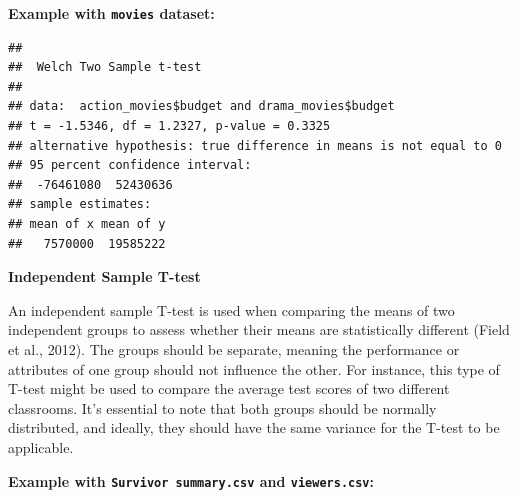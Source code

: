 \documentclass[
  b5paper]{book}
\newenvironment{Shaded}{\begin{snugshade}}{\end{snugshade}}
\newcommand{\CommentTok}[1]{\textcolor[rgb]{0.56,0.35,0.01}{\textit{#1}}}
\newcommand{\FunctionTok}[1]{\textcolor[rgb]{0.13,0.29,0.53}{\textbf{#1}}}
\newcommand{\NormalTok}[1]{#1}
\newcommand{\OtherTok}[1]{\textcolor[rgb]{0.56,0.35,0.01}{#1}}
\newcommand{\SpecialCharTok}[1]{\textcolor[rgb]{0.81,0.36,0.00}{\textbf{#1}}}
\newcommand{\StringTok}[1]{\textcolor[rgb]{0.31,0.60,0.02}{#1}}
\begin{document}
\textbf{Example with \texttt{movies} dataset:}

\begin{Shaded}
\end{Shaded}

\begin{verbatim}
## 
##  Welch Two Sample t-test
## 
## data:  action_movies$budget and drama_movies$budget
## t = -1.5346, df = 1.2327, p-value = 0.3325
## alternative hypothesis: true difference in means is not equal to 0
## 95 percent confidence interval:
##  -76461080  52430636
## sample estimates:
## mean of x mean of y 
##   7570000  19585222
\end{verbatim}

\textbf{Independent Sample T-test}

An independent sample T-test is used when comparing the means of two independent groups to assess whether their means are statistically different (Field et al., 2012). The groups should be separate, meaning the performance or attributes of one group should not influence the other. For instance, this type of T-test might be used to compare the average test scores of two different classrooms. It's essential to note that both groups should be normally distributed, and ideally, they should have the same variance for the T-test to be applicable.

\textbf{Example with \texttt{Survivor\ summary.csv} and \texttt{viewers.csv}:}
\end{document}
